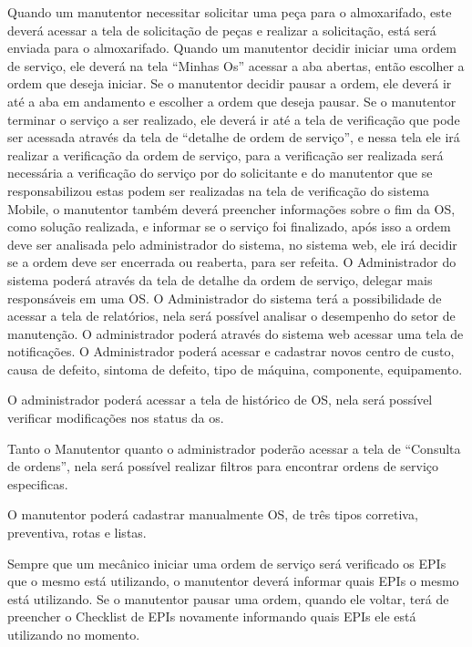 Quando um manutentor necessitar solicitar uma peça para o almoxarifado, este deverá acessar a tela de solicitação de peças e realizar a solicitação, está será enviada para o almoxarifado.
Quando um manutentor decidir iniciar uma ordem de serviço, ele deverá na tela “Minhas Os” acessar a aba abertas, então escolher a ordem que deseja iniciar. Se o manutentor decidir pausar a ordem, ele deverá ir até a aba em andamento e escolher a ordem que deseja pausar.
Se o manutentor terminar o serviço a ser realizado, ele deverá ir até a tela de verificação que pode ser acessada através da tela de “detalhe de ordem de serviço”, e nessa tela ele irá realizar a verificação da ordem de serviço, para a verificação ser realizada será necessária a verificação do serviço por do solicitante e do manutentor que se responsabilizou estas podem ser realizadas na tela de verificação do sistema Mobile, o manutentor também deverá preencher informações sobre o fim da OS, como solução realizada, e informar se o serviço foi finalizado, após isso a ordem deve ser analisada pelo administrador do sistema, no sistema web, ele irá decidir se a ordem deve ser encerrada ou reaberta, para ser refeita.
O Administrador do sistema poderá através da tela de detalhe da ordem de serviço, delegar mais responsáveis em uma OS.
O Administrador do sistema terá a possibilidade de acessar a tela de relatórios, nela será possível analisar o desempenho do setor de manutenção.
O administrador poderá através do sistema web acessar uma tela de notificações.
O Administrador poderá acessar e cadastrar novos centro de custo, causa de defeito,
sintoma de defeito, tipo de máquina, componente, equipamento.

\newpage

O administrador poderá acessar a tela de histórico de OS, nela será possível verificar modificações nos status da os.

Tanto o Manutentor quanto o administrador poderão acessar a tela de “Consulta de ordens”, nela será possível realizar filtros para encontrar ordens de serviço especificas.

O manutentor poderá cadastrar manualmente OS, de três tipos corretiva, preventiva, rotas e listas.

Sempre que um mecânico iniciar uma ordem de serviço será verificado os EPIs que o mesmo está utilizando, o manutentor deverá informar quais EPIs o mesmo está utilizando.
Se o manutentor pausar uma ordem, quando ele voltar, terá de preencher o Checklist de EPIs novamente informando quais EPIs ele está utilizando no momento.

